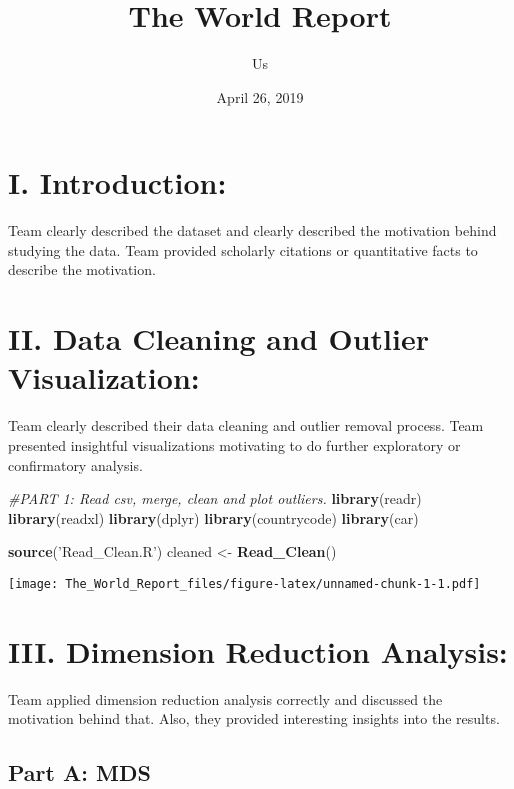 \documentclass[]{article}
\title{The World Report}
\author{Us}
\date{April 26, 2019}
\newenvironment{Shaded}{\begin{snugshade}}{\end{snugshade}}
\newcommand{\KeywordTok}[1]{\textcolor[rgb]{0.13,0.29,0.53}{\textbf{#1}}}
\newcommand{\StringTok}[1]{\textcolor[rgb]{0.31,0.60,0.02}{#1}}
\newcommand{\CommentTok}[1]{\textcolor[rgb]{0.56,0.35,0.01}{\textit{#1}}}
\newcommand{\NormalTok}[1]{#1}
\begin{document}
\maketitle

\section{I. Introduction:}\label{i.-introduction}

Team clearly described the dataset and clearly described the motivation
behind studying the data. Team provided scholarly citations or
quantitative facts to describe the motivation.

\section{II. Data Cleaning and Outlier
Visualization:}\label{ii.-data-cleaning-and-outlier-visualization}

Team clearly described their data cleaning and outlier removal process.
Team presented insightful visualizations motivating to do further
exploratory or confirmatory analysis.

\begin{Shaded}
\begin{Highlighting}[]
\CommentTok{#PART 1: Read csv, merge, clean and plot outliers.}
\KeywordTok{library}\NormalTok{(readr)}
\KeywordTok{library}\NormalTok{(readxl)}
\KeywordTok{library}\NormalTok{(dplyr)}
\KeywordTok{library}\NormalTok{(countrycode)}
\KeywordTok{library}\NormalTok{(car)}

\KeywordTok{source}\NormalTok{(}\StringTok{'Read_Clean.R'}\NormalTok{)}
\NormalTok{cleaned <-}\StringTok{ }\KeywordTok{Read_Clean}\NormalTok{()}
\end{Highlighting}
\end{Shaded}

\texttt{[image: The\_World\_Report\_files/figure-latex/unnamed-chunk-1-1.pdf]}

\section{III. Dimension Reduction
Analysis:}\label{iii.-dimension-reduction-analysis}

Team applied dimension reduction analysis correctly and discussed the
motivation behind that. Also, they provided interesting insights into
the results.

\subsection{Part A: MDS}\label{part-a-mds}
\end{document}
